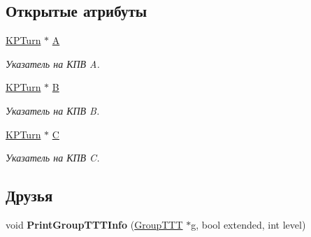 \subsection*{Открытые атрибуты}
\begin{DoxyCompactItemize}
\item 
\hypertarget{class_group_t_t_t_ad3b5c51cce7b241247dd274460a4a448}{
\hyperlink{class_k_p_turn}{KPTurn} $\ast$ \hyperlink{class_group_t_t_t_ad3b5c51cce7b241247dd274460a4a448}{A}}
\label{class_group_t_t_t_ad3b5c51cce7b241247dd274460a4a448}

\begin{DoxyCompactList}\small\item\em Указатель на КПВ A. \item\end{DoxyCompactList}\item 
\hypertarget{class_group_t_t_t_a5e05513b63907a22a20b1bce8a25efae}{
\hyperlink{class_k_p_turn}{KPTurn} $\ast$ \hyperlink{class_group_t_t_t_a5e05513b63907a22a20b1bce8a25efae}{B}}
\label{class_group_t_t_t_a5e05513b63907a22a20b1bce8a25efae}

\begin{DoxyCompactList}\small\item\em Указатель на КПВ B. \item\end{DoxyCompactList}\item 
\hypertarget{class_group_t_t_t_a2e8e8f3a0e21af68f030d70d604baceb}{
\hyperlink{class_k_p_turn}{KPTurn} $\ast$ \hyperlink{class_group_t_t_t_a2e8e8f3a0e21af68f030d70d604baceb}{C}}
\label{class_group_t_t_t_a2e8e8f3a0e21af68f030d70d604baceb}

\begin{DoxyCompactList}\small\item\em Указатель на КПВ C. \item\end{DoxyCompactList}\end{DoxyCompactItemize}
\subsection*{Друзья}
\begin{DoxyCompactItemize}
\item 
\hypertarget{class_group_t_t_t_a71faa943a1fbb6817aae943820bafdcb}{
void {\bfseries PrintGroupTTTInfo} (\hyperlink{class_group_t_t_t}{GroupTTT} $\ast$g, bool extended, int level)}
\label{class_group_t_t_t_a71faa943a1fbb6817aae943820bafdcb}

\end{DoxyCompactItemize}


